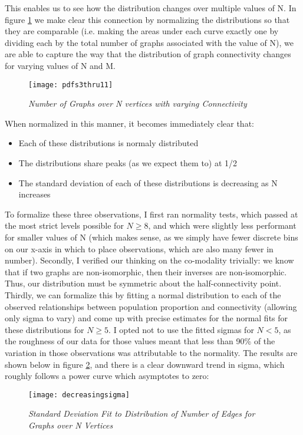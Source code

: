 This enables us to see how the distribution changes over multiple values of N.
In figure \ref{fig:ngraphs} we make clear this connection by normalizing the distributions so that they are comparable (i.e. making the areas under each curve exactly one by dividing each by the total number of graphs associated with the value of N), we are able to capture the way that the distribution of graph connectivity changes for varying values of N and M.

\begin{figure}[h]
\label{fig:ngraphs}
\caption{\emph{Number of Graphs over N vertices with varying Connectivity}}
\centering
\texttt{[image: pdfs3thru11]}
\end{figure}

When normalized in this manner, it becomes immediately clear that:
\begin{itemize}
\item{Each of these distributions is normaly distributed}
\item{The distributions share peaks (as we expect them to) at 1/2}
\item{The standard deviation of each of these distributions is decreasing as N increases}
\end{itemize}

To formalize these three observations, I first ran normality tests, which passed at the most strict levels possible for $N \geq 8$, and which were slightly less performant for smaller values of N (which makes sense, as we simply have fewer discrete bins on our x-axis in which to place observations, which are also many fewer in number).
Secondly, I verified our thinking on the co-modality trivially: we know that if two graphs are non-isomorphic, then their inverses are non-isomorphic.
Thus, our distribution must be symmetric about the half-connectivity point.
Thirdly, we can formalize this by fitting a normal distribution to each of the observed relationships between population proportion and connectivity (allowing only sigma to vary) and come up with precise estimates for the normal fits for these distributions for $N \geq 5$.
I opted not to use the fitted sigmas for $N < 5$, as the roughness of our data for those values meant that less than 90\% of the variation in those observations was attributable to the normality.
The results are shown below in figure \ref{fig:decreasingsigma}, and there is a clear downward trend in sigma, which roughly follows a power curve which asymptotes to zero:

\begin{figure}[h]
\label{fig:decreasingsigma}
\caption{\emph{Standard Deviation Fit to Distribution of Number of Edges for Graphs over N Vertices}}
\centering
\texttt{[image: decreasingsigma]}
\end{figure}

